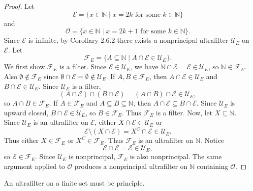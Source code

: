 \begin{proof}
    Let
    \[
        \mathcal{E} = \{x \in \mathbb{N} \mid x = 2k \text{ for some } k \in \mathbb{N}\}
    \]
    and
    \[
        \mathcal{O} = \{x \in \mathbb{N} \mid x = 2k+1 \text{ for some } k \in \mathbb{N}\}.
    \]
    Since $\mathcal{E}$ is infinite, by Corollary 2.6.2 there exists
    a nonprincipal ultrafilter $\mathcal{U}_E$ on $\mathcal{E}$.
    Let
    \[
        \mathcal{F}_E
        =
        \{ A \subseteq \mathbb{N} \mid A \cap \mathcal{E} \in \mathcal{U}_E \}.
    \]
    We first show $\mathcal{F}_E$ is a filter. Since $\mathcal{E} \in \mathcal{U}_E$,
    we have $\mathbb{N} \cap \mathcal{E} = \mathcal{E} \in \mathcal{U}_E$, so
    $\mathbb{N} \in \mathcal{F}_E$. Also $\emptyset \notin \mathcal{F}_E$ since
    $\emptyset \cap \mathcal{E} = \emptyset \notin \mathcal{U}_E$.
    If $A,B \in \mathcal{F}_E$, then $A \cap \mathcal{E} \in \mathcal{U}_E$
    and $B \cap \mathcal{E} \in \mathcal{U}_E$. Since $\mathcal{U}_E$ is a filter,
    \[
        (A \cap \mathcal{E}) \cap (B \cap \mathcal{E})
        =
        (A \cap B) \cap \mathcal{E}
        \in \mathcal{U}_E,
    \]
    so $A \cap B \in \mathcal{F}_E$.
    If $A \in \mathcal{F}_E$ and $A \subseteq B \subseteq \mathbb{N}$, then
    $A \cap \mathcal{E} \subseteq B \cap \mathcal{E}$. Since $\mathcal{U}_E$
    is upward closed, $B \cap \mathcal{E} \in \mathcal{U}_E$, so
    $B \in \mathcal{F}_E$. Thus $\mathcal{F}_E$ is a filter.
    Now, let $X \subseteq \mathbb{N}$. Since $\mathcal{U}_E$ is an ultrafilter
    on $\mathcal{E}$, either $X \cap \mathcal{E} \in \mathcal{U}_E$ or
    \[
        \mathcal{E} \setminus (X \cap \mathcal{E})
        =
        X^C \cap \mathcal{E}
        \in \mathcal{U}_E.
    \]
    Thus either $X \in \mathcal{F}_E$ or $X^C \in \mathcal{F}_E$.
    Thus $\mathcal{F}_E$ is an ultrafilter on $\mathbb{N}$.
    Notice
    \[
        \mathcal{E} \cap \mathcal{E} = \mathcal{E} \in \mathcal{U}_E,
    \]
    so $\mathcal{E} \in \mathcal{F}_E$.
    Since $\mathcal{U}_E$ is nonprincipal, $\mathcal{F}_E$ is also nonprincipal.
    The same argument applied to $\mathcal{O}$ produces a
    nonprincipal ultrafilter on $\mathbb{N}$ containing $\mathcal{O}$.
\end{proof}

\begin{tcolorbox}[title=Problem 3, breakable]
    An ultrafilter on a finite set must be principle.
\end{tcolorbox}

